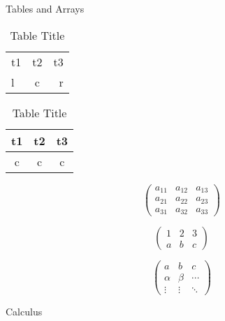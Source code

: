 \documentclass[10pt]{article}
\begin{document}
	\begin{Huge}
		Tables and Arrays
	\end{Huge}

	\begin{table}
		\caption{Table Title}
		\begin{tabular}{|lc|r}
			t1 & t2 & t3 \\
			\hhline{|=-|=}
			l & c &r 
		\end{tabular}
	\end{table}

	
	\begin{table}
	\caption{Table Title}
	\begin{tabular}{|c|c|c|}
		\hline
		t1 & t2 & t3 \\
		\hline
		c & c & c \\
		\hline
	\end{tabular}
	\end{table}
	
	\[
		\left(
		\begin{array}{ccc}
			a_{11} & a_{12} & a_{13} \\
			a_{21} & a_{22} & a_{23} \\
			a_{31} & a_{32} & a_{33} 
		\end{array}
		\right)
	\]
	
	
	\[
	\begin{pmatrix}
		1 & 2 & 3 \\
		a & b & c
	\end{pmatrix}
	\]
	
	
	\[
	\begin{pmatrix}
		a & b & c \\
		\alpha & \beta & \cdots \\
		\vdots & \vdots & \ddots
		
	\end{pmatrix}
	\]
	
	
	
	Calculus \\
	
	
\end{document}
